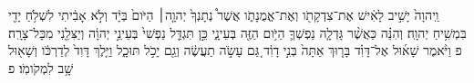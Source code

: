\documentclass{openreader}
\begin{document}
וַֽיהוָה֙ יָשִׁ֣יב לָאִ֔ישׁ אֶת־צִדְקָתֹ֖ו וְאֶת־אֱמֻנָתֹ֑ו אֲשֶׁר֩ נְתָנְךָ֙ יְהוָ֤ה׀ הַיֹּום֙ בְּיָ֔ד וְלֹ֣א אָבִ֔יתִי לִשְׁלֹ֥חַ יָדִ֖י בִּמְשִׁ֥יחַ יְהוָֽה׃ 
וְהִנֵּ֗ה כַּאֲשֶׁ֨ר גָּדְלָ֧ה נַפְשְׁךָ֛ הַיֹּ֥ום הַזֶּ֖ה בְּעֵינָ֑י כֵּ֣ן תִּגְדַּ֤ל נַפְשִׁי֙ בְּעֵינֵ֣י יְהוָ֔ה וְיַצִּלֵ֖נִי מִכָּל־צָרָֽה׃ פ 
וַיֹּ֨אמֶר שָׁא֜וּל אֶל־דָּוִ֗ד בָּר֤וּךְ אַתָּה֙ בְּנִ֣י דָוִ֔ד גַּ֚ם עָשֹׂ֣ה תַעֲשֶׂ֔ה וְגַ֖ם יָכֹ֣ל תּוּכָ֑ל וַיֵּ֤לֶךְ דָּוִד֙ לְדַרְכֹּ֔ו וְשָׁא֖וּל שָׁ֥ב לִמְקֹומֹֽו׃ פ 
\end{document}
